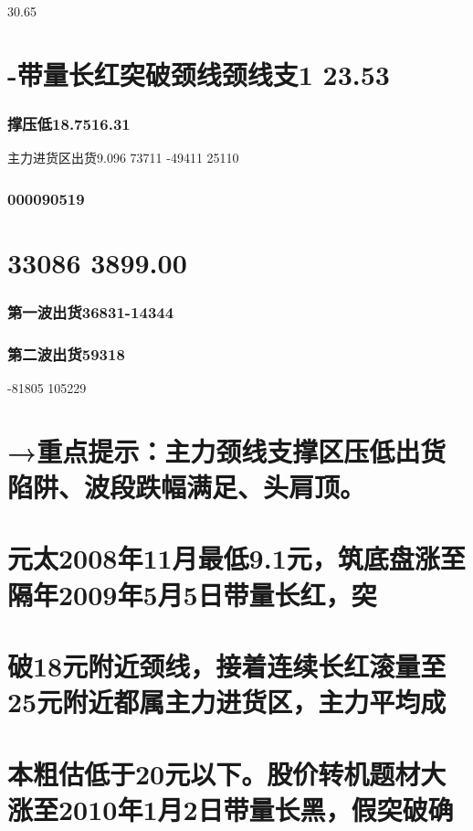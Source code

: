 \documentclass{article}
\begin{document}
30.65

\section{-带量长红突破颈线颈线支1 23.53}

\subsubsection{撑压低18.7516.31}

主力进货区出货9.096 73711 -49411 25110

\subsubsection{000090519}

\section{33086 3899.00}

\subsubsection{第一波出货36831-14344}

\subsubsection{第二波出货59318}

-81805 105229

\section{→重点提示：主力颈线支撑区压低出货陷阱、波段跌幅满足、头肩顶。}

\section{元太2008年11月最低9.1元，筑底盘涨至隔年2009年5月5日带量长红，突}

\section{破18元附近颈线，接着连续长红滚量至25元附近都属主力进货区，主力平均成}

\section{本粗估低于20元以下。股价转机题材大涨至2010年1月2日带量长黑，假突破确}
\end{document}
